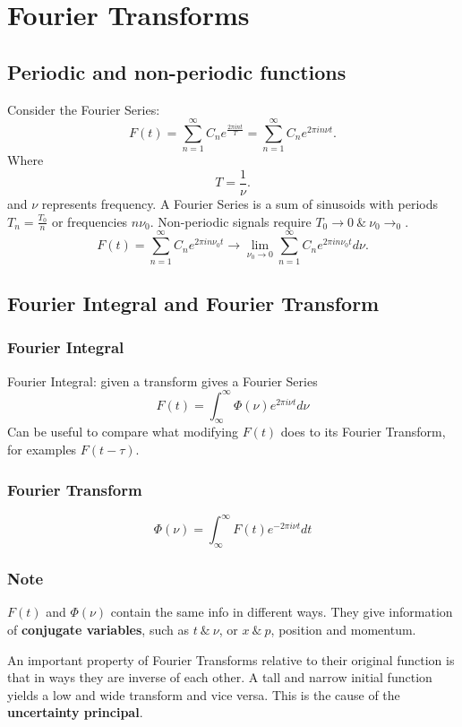 \section{Fourier Transforms}
\subsection{Periodic and non-periodic functions}

Consider the Fourier Series:
\[F(t)=\sum_{n=1}^{\infty}C_{n}e^{\frac{2 \pi i n t}{T}}=\sum_{n=1}^{\infty}C_{n}e^{2 \pi i n \nu t}.\] 
Where 
\[T=\frac{1}{\nu}.\] 
and $ \nu $ represents frequency.
A Fourier Series is a sum of sinusoids with periods $ T_{n}=\frac{T_0}{n} $ or frequencies $ n \nu_0 $.
Non-periodic signals require $ T_0\to 0\ \&\ \nu_0\to_0 $. 
\[F(t)=\sum_{n=1}^{\infty}C_{n}e^{2 \pi in \nu_0 t}\to\lim_{\nu_0\to 0}\sum_{n=1}^{\infty}C_{n}e^{2 \pi i n \nu_0 t}d\nu.\] 
\subsection{Fourier Integral and Fourier Transform}
\subsubsection{Fourier Integral}

Fourier Integral: given a transform gives a Fourier Series
\begin{equation}
	F(t)=\int_{\infty}^{\infty}\Phi(\nu)e^{2 \pi i \nu t}d \nu
\end{equation}
Can be useful to compare what modifying $ F(t) $ does to its Fourier Transform, for examples $ F(t-\tau) $.

\subsubsection{Fourier Transform}
\begin{equation}
	\Phi(\nu)=\int_{\infty}^{\infty}F(t)e^{-2 \pi i \nu t}dt
\end{equation}

\subsubsection{Note}
$ F(t) $ and $ \Phi(\nu) $ contain the same info in different ways. They give information of \textbf{conjugate variables}, such as $ t\ \&\ \nu $, or $ x\ \&\ p $, position and momentum.

An important property of Fourier Transforms relative to their original function is that in ways they are inverse of each other. A tall and narrow initial function yields a low and wide transform and vice versa. This is the cause of the \textbf{uncertainty principal}.

